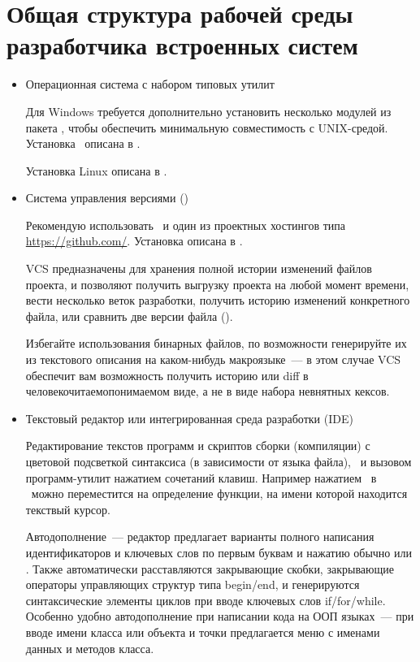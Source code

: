 \section{Общая структура рабочей среды разработчика встроенных систем}

\begin{itemize}
  \item Операционная система с набором типовых утилит
  
  Для Windows требуется дополнительно установить несколько модулей из пакета
  , чтобы обеспечить минимальную совместимость с UNIX-средой.
  Установка \ описана в .
  
  Установка Linux описана в .
  
  \item Система управления версиями ()
  
  Рекомендую использовать \git\ и один из проектных хостингов типа
  \url{https://github.com/}. Установка описана в .
  
  VCS предназначены для хранения полной истории изменений файлов проекта, и
  позволяют получить выгрузку проекта на любой момент времени, вести несколько
  веток разработки, получить историю изменений конкретного файла, или сравнить
  две версии файла ().
  
  Избегайте использования бинарных файлов, по возможности генерируйте их из
  текстового описания на каком-нибудь макроязыке\ --- в этом случае VCS
  обеспечит вам возможность получить историю или diff в
  человекочитаемопонимаемом виде, а не в виде набора невнятных кексов.
  
  \item Текстовый редактор или интегрированная среда разработки (IDE)
  
  Редактирование текстов программ и скриптов сборки (компиляции) с
  цветовой подсветкой синтаксиса (в зависимости от языка файла),
  \ и вызовом программ-утилит нажатием сочетаний 
  клавиш. Например нажатием \ в \eclipse\ можно переместится на
  определение функции, на имени которой находится текствый курсор.
  
  Автодополнение\ --- редактор предлагает варианты полного написания
  идентификаторов и ключевых слов по первым буквам и нажатию обычно
   или . Также автоматически расставляются
  закрывающие скобки, закрывающие операторы управляющих структур типа begin/end,
  и генерируются синтаксические элементы циклов при вводе ключевых слов
  if/for/while. Особенно удобно автодополнение при написании кода на ООП 
  языках\  --- при вводе имени класса или объекта и точки предлагается меню с
  именами данных и методов класса. 
  

\end{itemize}
